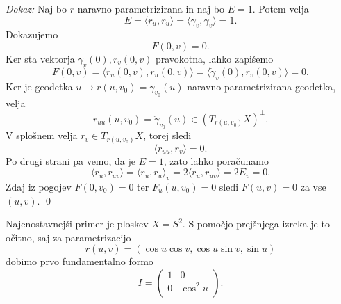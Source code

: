 \noindent
{\em Dokaz:\/}
Naj bo $r$ naravno parametrizirana in naj bo $E = 1$. Potem velja \begin{equation*}
E = \langle r_u, r_u \rangle = \langle \dot{\gamma}_v, \dot{\gamma}_v \rangle = 1. 
\end{equation*}
Dokazujemo \begin{equation*}
F(0, v) = 0.
\end{equation*}
Ker sta vektorja $\dot{\gamma}_v (0), r_v (0, v)$ pravokotna, lahko zapišemo  
\begin{equation*}
F(0, v ) = \langle r_u(0, v), r_u(0, v) \rangle = \langle \dot{\gamma}_v (0), r_v (0, v) \rangle =  0. 
\end{equation*}  
Ker je geodetka $u \mapsto r(u, v_0) = \gamma_{v_0}(u)$ naravno parametrizirana geodetka, velja \begin{equation*}
r_{uu}(u, v_0) = \ddot{\gamma}_{v_0}(u) \in (T_{r(u, v_0)}X)^{\perp}.
\end{equation*}  
V splošnem velja $r_v \in  T_{r(u, v_0)}X$, torej sledi \begin{equation*}
\langle r_{uu}, r_v \rangle = 0. 
\end{equation*}  
Po drugi strani pa vemo, da je $E = 1$, zato lahko poračunamo \begin{equation*}
\langle r_u, r_{uv} \rangle = \langle r_u, r_u \rangle_v = 2 \langle r_u, r_{uv} \rangle = 2 E_v = 0.   
\end{equation*}  
Zdaj iz pogojev $F(0, v_0) = 0$ ter $F_u(u, v_0) = 0$ sledi $F(u,v) = 0$ za vse $(u,v)$. 
\qed

\begin{primer}
Najenostavnejši primer je ploskev $X = S^2$. S pomočjo prejšnjega izreka je to očitno, saj za parametrizacijo \begin{equation*}
r(u, v) = (\cos u \cos v, \cos u \sin v, \sin u)
\end{equation*}dobimo prvo fundamentalno formo \begin{equation*}
I = \begin{pmatrix}
    1 & 0\\
    0 & \cos^2 u\\
\end{pmatrix}.
\end{equation*}  
\end{primer}

